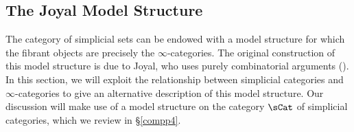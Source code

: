 

\subsection{The Joyal Model Structure}\label{compp3}

The category of simplicial sets can be endowed with a model structure for which the fibrant objects are precisely the $\infty$-categories. The original construction of this model structure is due to Joyal, who uses purely combinatorial arguments (\cite{joyalnotpub}). In this section, 
we will exploit the relationship between simplicial categories and
$\infty$-categories to give an alternative description of this model structure. 
Our discussion will make use of a model structure on the category $\sCat$ of simplicial categories, which we review in \S \ref{compp4}.

